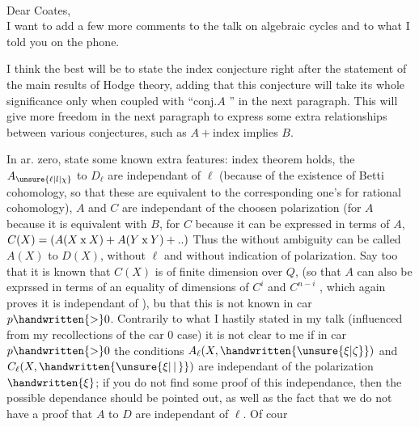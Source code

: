 \hfill{}\\
Dear Coates,\\

I want to add a few more comments to the talk on algebraic cycles
and to what I told you on the phone.

I think the best will be to state the index conjecture right after
the statement of the main results of Hodge theory, adding that this conjecture
will take its whole significance only when coupled with ``conj.$A$ ''
in the next paragraph. This will give more freedom in the next paragraph
to express some extra relationships between various conjectures, such
as $A+\text{index}$ implies $B$.

In ar. zero, state some known extra features: index theorem holds,
the  $A_{\unsure{\ell|l|\chi}}$ to $D_{\ell}$ are independant of $\ell$ (because of the existence
of Betti cohomology, so that these  are equivalent to the
corresponding one's for rational cohomology),  $A$ and $C$ are independant
of the choosen polarization (for $A$ because it is equivalent with $B$, for
$C$ because it can be expressed in terms of $A$, $C(X)=(A(X\mathbin{\mathrm{x}}X)+A(Y\mathbin{\mathrm{x}}Y)+\mathinner{..})$
Thus the  without ambiguity can be called $A(X)$ to $D(X)$,
without  $\ell$ and without indication of polarization. Say too that
it is known that $C(X)$ is of finite dimension over \uline{$Q$}, (so that $A$ can also
be exprssed in terms of an equality of dimensions of $C^{i}$ and $C^{n-i}$\deleted{\unsure{)|$\chi$}} , which
again proves it is independant of \hspace{1em}), bu that this is not known in
car $p\handwritten{>}0$. Contrarily to what I hastily stated in my talk (influenced
from my recollections of the car $0$ case) it is not clear to me if in car
$p\handwritten{>}0$ the conditions  $A_{\ell}(X,\handwritten{\unsure{\xi|\zeta}})$ and $C_{\ell}(X,\handwritten{\unsure{\xi|\,\vert\,}})$ are independant of the
polarization $\handwritten{\xi}$; if you do not find some proof of this independance, then
the possible dependance should be pointed out, as well as the fact that 
 we do not have a proof that $A$ to $D$ are independant of $\ell$. Of cour%
